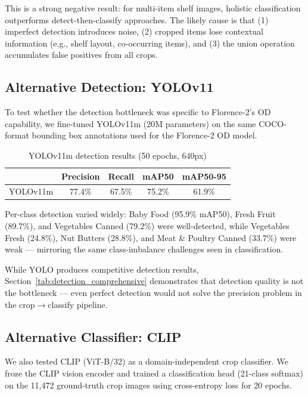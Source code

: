 \documentclass[11pt]{article}
\begin{document}
This is a strong negative result: for multi-item shelf images, holistic classification outperforms detect-then-classify approaches. The likely cause is that (1) imperfect detection introduces noise, (2) cropped items lose contextual information (e.g., shelf layout, co-occurring items), and (3) the union operation accumulates false positives from all crops.

\subsection{Alternative Detection: YOLOv11}

To test whether the detection bottleneck was specific to Florence-2's OD capability, we fine-tuned YOLOv11m (20M parameters) on the same COCO-format bounding box annotations used for the Florence-2 OD model.

\begin{table}[h]
\centering
\caption{YOLOv11m detection results (50 epochs, 640px)}
\label{tab:yolo}
\begin{tabular}{lcccc}
\toprule
 & Precision & Recall & mAP50 & mAP50-95 \\
\midrule
YOLOv11m & 77.4\% & 67.5\% & 75.2\% & 61.9\% \\
\bottomrule
\end{tabular}
\end{table}

Per-class detection varied widely: Baby Food (95.9\% mAP50), Fresh Fruit (89.7\%), and Vegetables Canned (79.2\%) were well-detected, while Vegetables Fresh (24.8\%), Nut Butters (28.8\%), and Meat \& Poultry Canned (33.7\%) were weak --- mirroring the same class-imbalance challenges seen in classification.

While YOLO produces competitive detection results, Section~\ref{tab:detection_comprehensive} demonstrates that detection quality is not the bottleneck --- even perfect detection would not solve the precision problem in the crop$\rightarrow$classify pipeline.

\subsection{Alternative Classifier: CLIP}

We also tested CLIP (ViT-B/32) as a domain-independent crop classifier. We froze the CLIP vision encoder and trained a classification head (21-class softmax) on the 11,472 ground-truth crop images using cross-entropy loss for 20 epochs.
\end{document}
